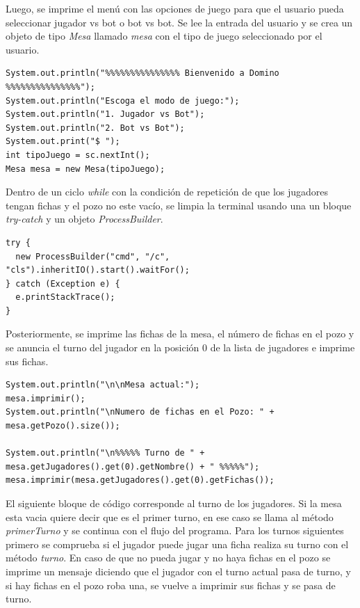 \documentclass[12pt]{article}
\begin{document}
  Luego, se imprime el menú con las opciones de juego para que el usuario pueda seleccionar jugador vs bot o bot vs bot. Se lee la entrada del usuario y se crea un objeto de tipo \textit{Mesa} llamado \textit{mesa} con el tipo de juego seleccionado por el usuario.

  \begin{lstlisting}
System.out.println("%%%%%%%%%%%%%%% Bienvenido a Domino %%%%%%%%%%%%%%%");
System.out.println("Escoga el modo de juego:");
System.out.println("1. Jugador vs Bot");
System.out.println("2. Bot vs Bot");
System.out.print("$ ");
int tipoJuego = sc.nextInt();
Mesa mesa = new Mesa(tipoJuego);
  \end{lstlisting}

  Dentro de un ciclo \textit{while} con la condición de repetición de que los jugadores tengan fichas y el pozo no este vacío, se limpia la terminal usando una un bloque \textit{try-catch} y un objeto \textit{ProcessBuilder}.

  \begin{lstlisting}
try {
  new ProcessBuilder("cmd", "/c", "cls").inheritIO().start().waitFor();
} catch (Exception e) {
  e.printStackTrace();
}
  \end{lstlisting}

  Posteriormente, se imprime las fichas de la mesa, el número de fichas en el pozo y se anuncia el turno del jugador en la posición 0 de la lista de jugadores e imprime sus fichas. 

  \begin{lstlisting}
System.out.println("\n\nMesa actual:");
mesa.imprimir();
System.out.println("\nNumero de fichas en el Pozo: " + mesa.getPozo().size());

System.out.println("\n%%%%% Turno de " + mesa.getJugadores().get(0).getNombre() + " %%%%%");
mesa.imprimir(mesa.getJugadores().get(0).getFichas());
  \end{lstlisting}
 
  El siguiente bloque de código corresponde al turno de los jugadores. Si la mesa esta vacia quiere decir que es el primer turno, en ese caso se llama al método \textit{primerTurno} y se continua con el flujo del programa. Para los turnos siguientes primero se comprueba si el jugador puede jugar una ficha realiza su turno con el método \textit{turno}. En caso de que no pueda jugar y no haya fichas en el pozo se imprime un mensaje diciendo que el jugador con el turno actual pasa de turno, y si hay fichas en el pozo roba una, se vuelve a imprimir sus fichas y se pasa de turno. 
\end{document}
